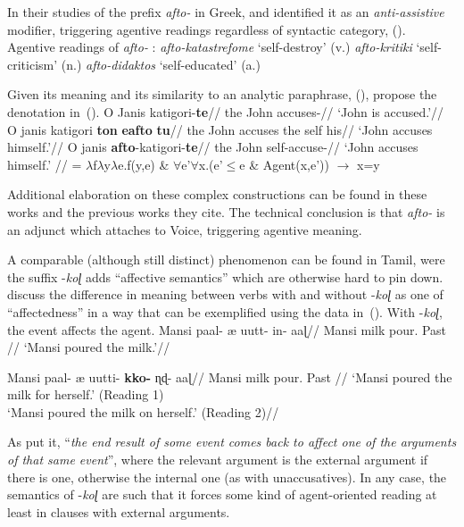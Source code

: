 {In their studies of the prefix \emph{afto-} in Greek, \cite{alexiadouafto} and \cite{spathasetal15} identified it as an \emph{anti-assistive} modifier, triggering agentive readings regardless of syntactic category, (\nextx).
\pex Agentive readings of \emph{afto-} \citep[61]{alexiadouafto}:
	\a \emph{afto-katastrefome} `self-destroy' (v.)
	\a \emph{afto-kritiki} `self-criticism' (n.)
	\a \emph{afto-didaktos} `self-educated' (a.)
\xe

Given its meaning and its similarity to an analytic paraphrase, (\nextx), \cite{spathasetal15} propose the denotation in~(\anextx).
\pex
	\a \begingl
		\gla O Janis katigori-\textbf{te}//
		\glb the John accuses-//
		\glft `John is accused.'//
	\endgl
	\a \begingl
		\gla O janis katigori \textbf{ton} \textbf{eafto} \textbf{tu}//
		\glb the John accuses the self his//
		\glft `John accuses himself.'//
	\endgl
	\a \begingl
		\gla O janis \textbf{afto}-katigori-\textbf{te}//
		\glb the John self-accuse-//
		\glft `John accuses himself.' //
	\endgl
\xe
\ex {} = $\lambda$f$\lambda$y$\lambda$e.f(y,e) \& $\forall$e'$\forall$x.(e'$\le$e \& Agent(x,e')) $\rightarrow$ x=y 
\xe

Additional elaboration on these complex constructions can be found in these works and the previous works they cite. The technical conclusion is that \emph{afto-} is an adjunct which attaches to Voice, triggering agentive meaning.

A comparable (although still distinct) phenomenon can be found in Tamil, were the suffix -\emph{koɭ} adds ``affective semantics'' which are otherwise hard to pin down. \cite{sundaresanmcfadden17} discuss the difference in meaning between verbs with and without -\emph{koɭ} as one of ``affectedness'' in a way that can be exemplified using the data in~(\nextx). With -\emph{koɭ}, the event affects the agent.
\pex
	\a \begingl
	\gla Mansi paal- æ uutt- in- aaɭ//
	\glb Mansi milk  pour. Past //
	\glft `Mansi poured the milk.'//
	\endgl

	\a 	\begingl
	\gla Mansi paal- æ uutti- \textbf{kko-} ɳɖ- aaɭ//
	\glb Mansi milk  pour.  Past //
	\glft `Mansi poured the milk for herself.' (Reading 1)\\
		`Mansi poured the milk on herself.' (Reading 2)//
	\endgl
\xe

As \citet[165]{sundaresanmcfadden17} put it, ``\emph{the end result of some event comes back to affect one of the arguments of that same event}'', where the relevant argument is the external argument if there is one, otherwise the internal one (as with unaccusatives). In any case, the semantics of -\emph{koɭ} are such that it forces some kind of agent-oriented reading at least in clauses with external arguments.

}
